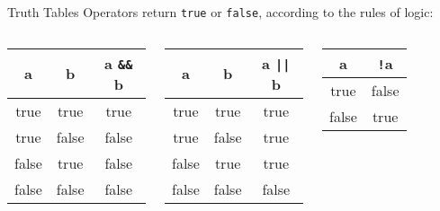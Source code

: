 \documentclass[../lecture3-flowofcontrol.tex]{subfiles}
\begin{document}
\begin{frame}[fragile]{Truth Tables}
    Operators return \verb|true| or \verb|false|, according to the rules of logic:

    \begin{columns}[T,onlytextwidth]
            \begin{table}
                \begin{tabular}{c|c|c}
                    \toprule
                    \textbf{a} & \textbf{b} & \bfseries{a \verb|&&| b} \\
                    \midrule
                    true  & true  & true  \\
                    true  & false & false \\
                    false & true  & false \\
                    false & false & false \\
                    \bottomrule
                \end{tabular}
            \end{table}
            \begin{table}
                \begin{tabular}{c|c|c}
                    \toprule
                    \textbf{a} & \textbf{b} & \bfseries{a \verb+||+ b} \\
                    \midrule
                    true  & true  & true  \\
                    true  & false & true  \\
                    false & true  & true  \\
                    false & false & false \\
                    \bottomrule
                \end{tabular}
            \end{table}
            \begin{table}
                \begin{tabular}{c|c}
                    \toprule
                    \textbf{a} & \bfseries{\verb|!|a} \\
                    \midrule
                    true  & false \\
                    false & true  \\
                    \bottomrule
                \end{tabular}
            \end{table}
    \end{columns}


\end{frame}
\end{document}
